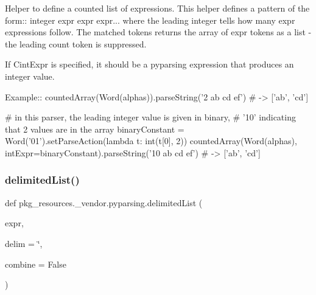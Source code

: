 \begin{DoxyVerb}Helper to define a counted list of expressions.
This helper defines a pattern of the form::
    integer expr expr expr...
where the leading integer tells how many expr expressions follow.
The matched tokens returns the array of expr tokens as a list - the leading count token is suppressed.

If C{intExpr} is specified, it should be a pyparsing expression that produces an integer value.

Example::
    countedArray(Word(alphas)).parseString('2 ab cd ef')  # -> ['ab', 'cd']

    # in this parser, the leading integer value is given in binary,
    # '10' indicating that 2 values are in the array
    binaryConstant = Word('01').setParseAction(lambda t: int(t[0], 2))
    countedArray(Word(alphas), intExpr=binaryConstant).parseString('10 ab cd ef')  # -> ['ab', 'cd']
\end{DoxyVerb}
 \mbox{\label{namespacepkg__resources_1_1__vendor_1_1pyparsing_aa689efbc59c6d46b1b9c16becee9f1b4}} 
\subsubsection{\texorpdfstring{delimited\+List()}{delimitedList()}}
{\footnotesize\ttfamily def pkg\+\_\+resources.\+\_\+vendor.\+pyparsing.\+delimited\+List (\begin{DoxyParamCaption}\item[{}]{expr,  }\item[{}]{delim = {\ttfamily \char`\"{}},  }\item[{}]{combine = {\ttfamily False} }\end{DoxyParamCaption})}

